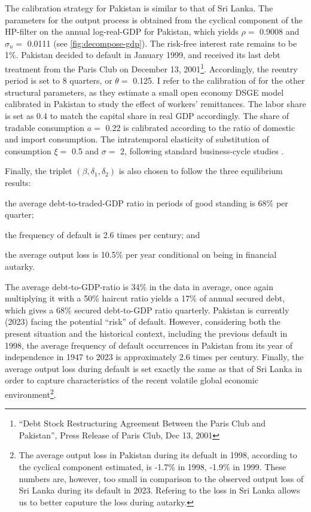 The calibration strategy for Pakistan is similar to that of Sri Lanka.
The parameters for the output process is obtained from the cyclical component of the HP-filter on the annual log-real-GDP for Pakistan, which yields $\rho = $ 0.9008 and $\sigma_u=$ 0.0111 (see \autoref{fig:decompose-gdp}).
The risk-free interest rate remains to be 1\%. 
Pakistan decided to default in January 1999\citep{pakistan-default-start}, and received its last debt treatment from the Paris Club on December 13, 2001\footnote{``Debt Stock Restructuring Agreement Between
the Paris Club and Pakistan'', Press Release of Paris Club, Dec 13, 2001}.
Accordingly, the reentry period is set to 8 quarters, or $\theta=$ 0.125.
I refer to the calibration of \citet{Pakistan-DSGE-calibration} for the other structural parameters, as they estimate a small open economy DSGE model calibrated in Pakistan to study the effect of workers' remittances.
The labor share is set as 0.4 to match the capital share in real GDP accordingly. The share of tradable consumption $a=$ 0.22 is calibrated according to the ratio of domestic and import consumption. The intratemporal elasticity of substitution of consumption $\xi=$ 0.5 and $\sigma=$ 2, following standard business-cycle studies \citep{Pakistan-DSGE-calibration,Uribe-Schmitt-Grohe-textbook}.

Finally, the triplet $\left( \beta, \delta_1, \delta_2 \right)$ is also chosen to follow the three equilibrium results:
\begin{enumerate*}[label = (\roman*)]
    \item the average debt-to-traded-GDP ratio in periods of good standing is 68\% per quarter;
    \item the frequency of default is 2.6 times per century; and
    \item the average output loss is 10.5\% per year conditional on being in financial autarky.
\end{enumerate*}
The average debt-to-GDP-ratio is 34\% in the data in average, once again multiplying it with a 50\% haircut ratio yields a 17\% of annual secured debt, which gives a 68\% secured debt-to-GDP ratio quarterly.
Pakistan is currently (2023) facing the potential ``risk'' of default\footnotemark{}. 
However, considering both the present situation and the historical context, including the previous default in 1998, the average frequency of default occurrences in Pakistan from its year of independence in 1947 to 2023 is approximately 2.6 times per century\footnotemark{}.
Finally, the average output loss during default is set exactly the same as that of Sri Lanka in order to capture characteristics of the recent volatile global economic environment\footnote{The average output loss in Pakistan during its defualt in 1998, according to the cyclical component estimated, is -1.7\% in 1998, -1.9\% in 1999. These numbers are, however, too small in comparison to the observed output loss of Sri Lanka during its default in 2023. Refering to the loss in Sri Lanka allows us to better caputure the loss during autarky.}.
